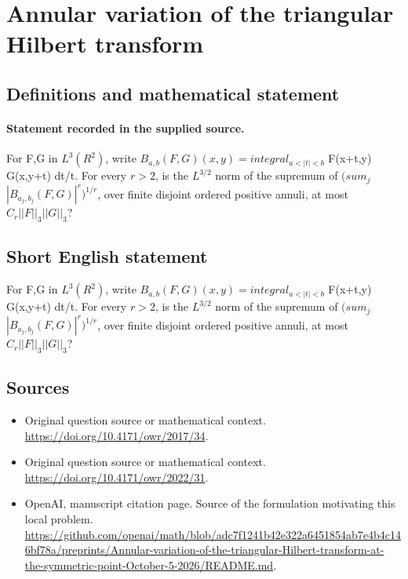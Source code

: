 \documentclass[11pt]{article}
\begin{document}
\section*{Annular variation of the triangular Hilbert transform}\label{30007438}
\subsection{Definitions and mathematical statement}
\paragraph{Statement recorded in the supplied source.}
For F,G in $L^3(R^2)$, write $B_{a,b}(F,G)(x,y)=integral_{a<|t|<b}$ F(x+t,y) G(x,y+t) dt/t. For every $r>2$, is the $L^{3/2}$ norm of the supremum of $(sum_j$ $|B_{a_j,b_j}(F,G)|^r)^{1/r}$, over finite disjoint ordered positive annuli, at most $C_r||F||_3||G||_3$?
\subsection{Short English statement}
For F,G in $L^3(R^2)$, write $B_{a,b}(F,G)(x,y)=integral_{a<|t|<b}$ F(x+t,y) G(x,y+t) dt/t. For every $r>2$, is the $L^{3/2}$ norm of the supremum of $(sum_j$ $|B_{a_j,b_j}(F,G)|^r)^{1/r}$, over finite disjoint ordered positive annuli, at most $C_r||F||_3||G||_3$?
\subsection{Sources}
\begin{itemize}
\item[S1] Original question source or mathematical context.
\url{https://doi.org/10.4171/owr/2017/34}.
\item[S2] Original question source or mathematical context.
\url{https://doi.org/10.4171/owr/2022/31}.
\item[S3] OpenAI, manuscript citation page. Source of the formulation motivating this local problem.
\url{https://github.com/openai/math/blob/adc7f1241b42e322a6451854ab7e4b4c146bf78a/preprints/Annular-variation-of-the-triangular-Hilbert-transform-at-the-symmetric-point-October-5-2026/README.md}.
\end{itemize}
\end{document}
